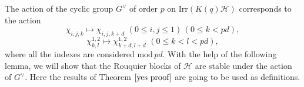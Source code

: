 \documentclass[10pt,a4paper,titlepage]{article}
\begin{document}
The action of the cyclic group $G^\vee$ of order $p$ on $\mathrm{Irr}(K(q)\mathcal{H})$ corresponds to the action 
$$\chi_{i,j,k} \mapsto \chi_{i,j,k+d }\,\, (0\leq i,j\leq 1) \,(0 \leq k <pd),$$
$$\chi_{k,l}^{1,2} \mapsto \chi_{k+d ,l+d }^{1,2}\,\,
(0 \leq k <l<pd),$$
where all the indexes are considered  $\mathrm{mod}\,pd$.
%
With the help of the following lemma, we will show that the Rouquier blocks of 
$\mathcal{H}$ are stable under the action of $G^\vee$. Here the results of Theorem $\ref{yes proof}$ are going to be used as definitions.
\end{document}
